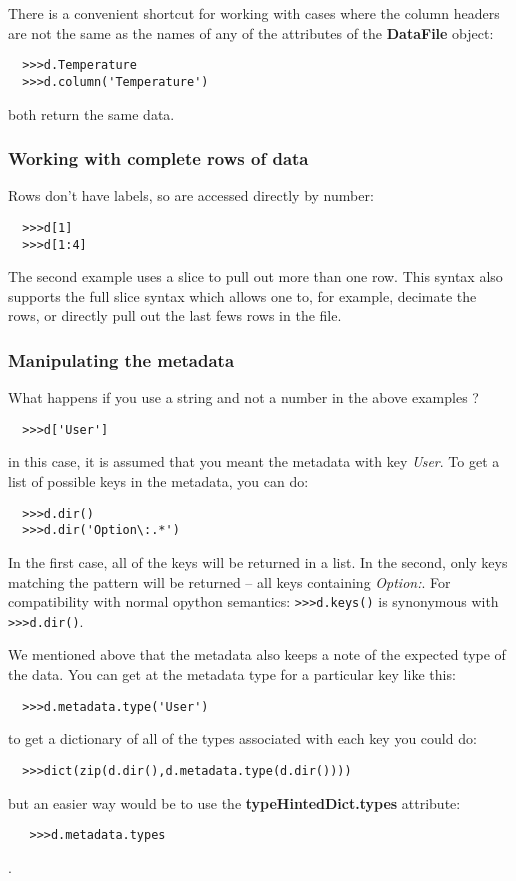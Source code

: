 \documentclass[a4paper,11pt]{scrartcl}
\begin{document}
There is a convenient shortcut for working with cases where the column headers are not the same
as the names of any of the attributes of the \textbf{DataFile} object:
\begin{verbatim}
  >>>d.Temperature
  >>>d.column('Temperature')
\end{verbatim}
both return the same data.

\subsubsection{Working with complete rows of data}

Rows don't have labels, so are accessed directly by number:
\begin{verbatim}
  >>>d[1]
  >>>d[1:4]
\end{verbatim}
The second example uses a slice to pull out more than one row. This syntax also
supports the full slice syntax which allows one to, for example, decimate the
rows, or directly pull out the last fews rows in the file.

\subsubsection{Manipulating the metadata}

What happens if you use a string and not a number in the above examples ?
\begin{verbatim}
  >>>d['User']
\end{verbatim}
in this case, it is assumed that you meant the metadata with key \textit{User}.
To get a list of possible keys in the metadata, you can do:
\begin{verbatim}
  >>>d.dir()
  >>>d.dir('Option\:.*')
\end{verbatim}
In the first case, all of the keys will be returned in a list. In the second,
only keys matching the pattern will be returned -- all keys containing
\textit{Option:}. For compatibility with normal opython semantics: \verb#>>>d.keys()# is
synonymous with \verb#>>>d.dir()#.

We mentioned above that the metadata also keeps a note of the expected type of
the data. You can get at the metadata type for a particular key like this:
\begin{verbatim}
  >>>d.metadata.type('User')
\end{verbatim}
to get a dictionary of all of the types associated with each key you could do:
\begin{verbatim}
  >>>dict(zip(d.dir(),d.metadata.type(d.dir())))
\end{verbatim}
but an easier way would be to use the \textbf{typeHintedDict.types} attribute:
\begin{verbatim}
   >>>d.metadata.types
\end{verbatim}
.
\end{document}
